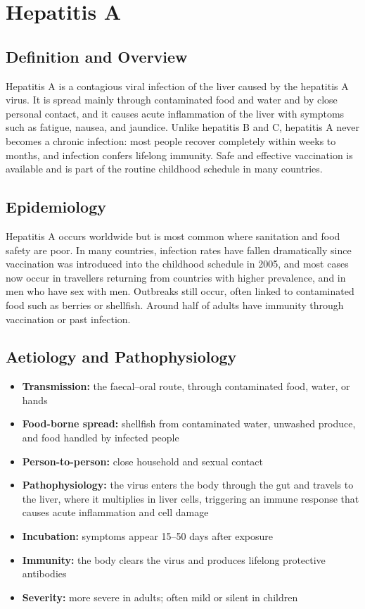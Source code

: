 \chapter{Hepatitis A}

\section*{Definition and Overview}
Hepatitis A is a contagious viral infection of the liver caused by the hepatitis A virus. It is spread mainly through contaminated food and water and by close personal contact, and it causes acute inflammation of the liver with symptoms such as fatigue, nausea, and jaundice. Unlike hepatitis B and C, hepatitis A never becomes a chronic infection: most people recover completely within weeks to months, and infection confers lifelong immunity. Safe and effective vaccination is available and is part of the routine childhood schedule in many countries.

\section*{Epidemiology}
Hepatitis A occurs worldwide but is most common where sanitation and food safety are poor. In many countries, infection rates have fallen dramatically since vaccination was introduced into the childhood schedule in 2005, and most cases now occur in travellers returning from countries with higher prevalence, and in men who have sex with men. Outbreaks still occur, often linked to contaminated food such as berries or shellfish. Around half of adults have immunity through vaccination or past infection.

\section*{Aetiology and Pathophysiology}
\begin{itemize}
    \item \textbf{Transmission:} the faecal--oral route, through contaminated food, water, or hands
    \item \textbf{Food-borne spread:} shellfish from contaminated water, unwashed produce, and food handled by infected people
    \item \textbf{Person-to-person:} close household and sexual contact
    \item \textbf{Pathophysiology:} the virus enters the body through the gut and travels to the liver, where it multiplies in liver cells, triggering an immune response that causes acute inflammation and cell damage
    \item \textbf{Incubation:} symptoms appear 15--50 days after exposure
    \item \textbf{Immunity:} the body clears the virus and produces lifelong protective antibodies
    \item \textbf{Severity:} more severe in adults; often mild or silent in children
\end{itemize}

